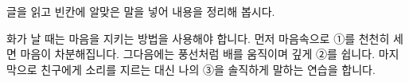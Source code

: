 \documentclass[fs13,seriesSau]{korfarm-base}
\begin{document}
\kfActivityBg \par{}\par\nopagebreak[4]\smallskip\nopagebreak[4]
\begin{kfBlankList}
\kfBlankItem 글을 읽고 빈칸에 알맞은 말을 넣어 내용을 정리해 봅시다.

화가 날 때는 마음을 지키는 방법을 사용해야 합니다.  먼저 마음속으로 ①\kfFillBlank[12mm]{}를 천천히 세면 마음이 차분해집니다.  그다음에는 풍선처럼 배를 움직이며 깊게 ②\kfFillBlank[12mm]{}를 쉽니다.  마지막으로 친구에게 소리를 지르는 대신 나의 ③\kfFillBlank[12mm]{}을 솔직하게 말하는 연습을 합니다.
\end{kfBlankList}

\kfActivityBg \par{}\par\nopagebreak[4]\smallskip\nopagebreak[4]

\end{document}
